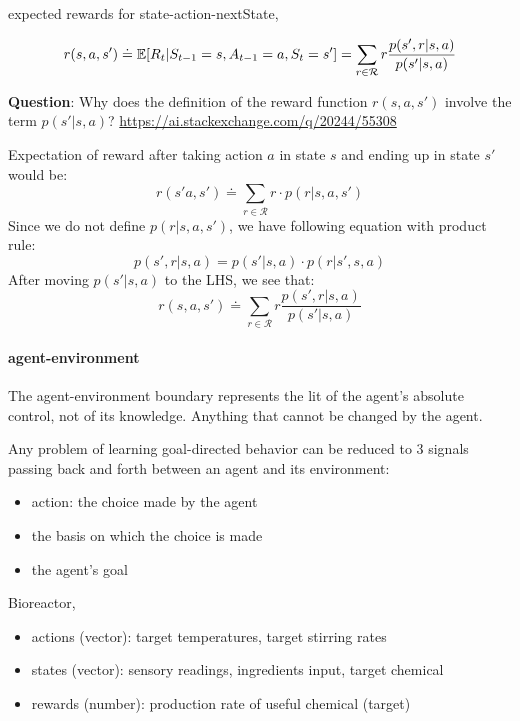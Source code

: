 \documentclass[sutton_barto_notes.tex]{subfiles}
\begin{document}
\begin{definition}
expected rewards for state-action-nextState,

$$ r(s,a,s') \doteq \operatorname*{\mathbb{E}} [R_t | S_{t-1}=s, A_{t-1}=a, S_t=s'] = \sum_{r \in \mathcal{R}} r \frac{p(s',r|s,a)}{p(s'|s,a)} $$
\end{definition}

\textbf{Question}: Why does the definition of the reward function $r(s,a,s')$ involve the term $p(s'|s,a)$? \url{https://ai.stackexchange.com/q/20244/55308}

Expectation of reward after taking action $a$ in state $s$ and ending up in state $s'$ would be:
$$ r(s'a,s') \doteq \sum_{r\in \mathcal{R}} r \cdot p(r|s,a,s') $$
Since we do not define $p(r|s,a,s')$, we have following equation with product rule:
$$ p(s',r|s,a) = p(s'|s,a) \cdot p(r|s',s,a) $$
After moving $p(s'|s,a)$ to the LHS, we see that:
$$ r(s,a,s') \doteq \sum_{r \in \mathcal{R}} r \frac{p(s',r|s,a)}{p(s'|s,a)} $$



\paragraph{agent-environment}
The agent-environment boundary represents the lit of the agent's absolute control, not of its knowledge. Anything that cannot be changed by the agent.

Any problem of learning goal-directed behavior can be reduced to 3 signals passing back and forth between an agent and its environment:
\begin{itemize}
\item action: the choice made by the agent
\item the basis on which the choice is made
\item the agent's goal
\end{itemize}

\begin{example}
Bioreactor,

\begin{itemize}
\item actions (vector): target temperatures, target stirring rates
\item states (vector): sensory readings, ingredients input, target chemical
\item rewards (number): production rate of useful chemical (target)
\end{itemize}

\end{example}
\end{document}
